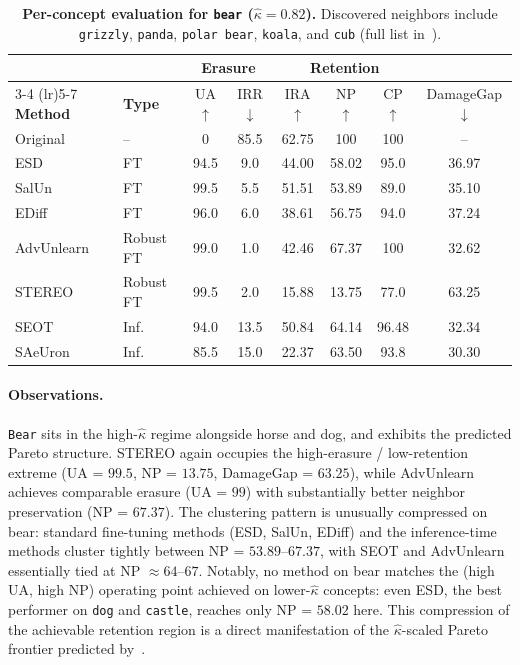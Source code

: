 \begin{table}[h]
\centering
\small
\setlength{\tabcolsep}{5pt}
\begin{tabular}{llcccccc}
\toprule
& & \multicolumn{2}{c}{\textbf{Erasure}} & \multicolumn{3}{c}{\textbf{Retention}} & \\
\cmidrule(lr){3-4} \cmidrule(lr){5-7}
\textbf{Method} & \textbf{Type} & UA$\uparrow$ & IRR$\downarrow$ & IRA$\uparrow$ & NP$\uparrow$ & CP$\uparrow$ & DamageGap$\downarrow$ \\
\midrule
Original    & --          & 0     & 85.5  & 62.75 & 100   & 100   & --    \\
\midrule
ESD         & FT          & 94.5  & 9.0   & 44.00 & 58.02 & 95.0  & 36.97 \\
SalUn       & FT          & 99.5  & 5.5   & 51.51 & 53.89 & 89.0  & 35.10 \\
EDiff       & FT          & 96.0  & 6.0   & 38.61 & 56.75 & 94.0  & 37.24 \\
\midrule
AdvUnlearn  & Robust FT   & 99.0  & 1.0   & 42.46 & 67.37 & 100   & 32.62 \\
STEREO      & Robust FT   & 99.5  & 2.0   & 15.88 & 13.75 & 77.0  & 63.25 \\
\midrule
SEOT        & Inf.        & 94.0  & 13.5  & 50.84 & 64.14 & 96.48 & 32.34 \\
SAeUron     & Inf.        & 85.5  & 15.0  & 22.37 & 63.50 & 93.8  & 30.30 \\
\bottomrule
\end{tabular}
\caption{\textbf{Per-concept evaluation for \texttt{bear} ($\hat\kappa = 0.82$).} Discovered neighbors include \texttt{grizzly}, \texttt{panda}, \texttt{polar bear}, \texttt{koala}, and \texttt{cub} (full list in~).}
\label{tab:per_concept_bear}
\end{table}

\paragraph{Observations.}
\texttt{Bear} sits in the high-$\hat\kappa$ regime alongside horse and dog, and exhibits the predicted Pareto structure. STEREO again occupies the high-erasure / low-retention extreme (UA = $99.5$, NP = $13.75$, DamageGap = $63.25$), while AdvUnlearn achieves comparable erasure (UA = $99$) with substantially better neighbor preservation (NP = $67.37$). The clustering pattern is unusually compressed on bear: standard fine-tuning methods (ESD, SalUn, EDiff) and the inference-time methods cluster tightly between NP = $53.89$--$67.37$, with SEOT and AdvUnlearn essentially tied at NP $\approx 64$--$67$. Notably, no method on bear matches the (high UA, high NP) operating point achieved on lower-$\hat\kappa$ concepts: even ESD, the best performer on \texttt{dog} and \texttt{castle}, reaches only NP = $58.02$ here. This compression of the achievable retention region is a direct manifestation of the $\hat\kappa$-scaled Pareto frontier predicted by~.
